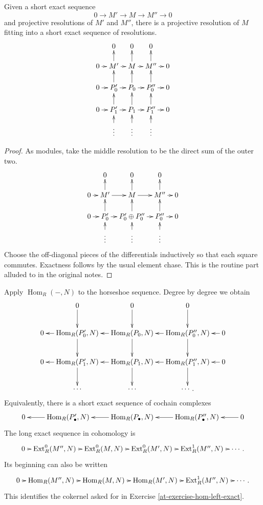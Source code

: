 \begin{lemma}
\label{at-lemma-horseshoe}
Given a short exact sequence
$$
0\longrightarrow M'
\longrightarrow M
\longrightarrow M''
\longrightarrow0
$$
and projective resolutions of $M'$ and
$M''$, there is a projective resolution of
$M$ fitting into a short exact sequence of
resolutions.
$$
\xymatrix@C=.7em@R=1.5em{
  & 0
    & 0
    & 0 \\
0 \ar[r]
  & M' \ar[r] \ar[u]
  & M \ar[r] \ar[u]
  & M'' \ar[r] \ar[u]
  & 0 \\
0 \ar[r]
  & P'_0 \ar[r] \ar[u]
  & P_0 \ar[r] \ar[u]
  & P''_0 \ar[r] \ar[u]
  & 0 \\
0 \ar[r]
  & P'_1 \ar[r] \ar[u]
  & P_1 \ar[r] \ar[u]
  & P''_1 \ar[r] \ar[u]
  & 0 \\
  & \vdots \ar[u]
  & \vdots \ar[u]
  & \vdots \ar[u]
}
$$
\end{lemma}

\begin{proof}
As modules, take the middle resolution to
be the direct sum of the outer two.
$$
\xymatrix@C=.7em@R=1.5em{
  & 0
    & 0
    & 0 \\
0 \ar[r]
  & M' \ar[r] \ar[u]
  & M \ar[r] \ar[u]
  & M'' \ar[r] \ar[u]
  & 0 \\
0 \ar[r]
  & P'_0 \ar[r] \ar[u]
  & P'_0\oplus P''_0 \ar[r] \ar[u]
  & P''_0 \ar[r] \ar[u]
  & 0 \\
  & \vdots \ar[u]
  & \vdots \ar[u]
  & \vdots \ar[u].
}
$$
Choose the off-diagonal pieces of the
differentials inductively so that each
square commutes.  Exactness follows by the
usual element chase.  This is the routine
part alluded to in the original notes.
\end{proof}

\noindent
Apply $\operatorname{Hom}_R(-,N)$ to the
horseshoe sequence.  Degree by degree we
obtain
$$
\xymatrix@C=1.1em{
  & 0 \ar[d]
    & 0 \ar[d]
    & 0 \ar[d] \\
0
  & \operatorname{Hom}_R(P'_0,N)
    \ar[l] \ar[d]
  & \operatorname{Hom}_R(P_0,N)
    \ar[l] \ar[d]
  & \operatorname{Hom}_R(P''_0,N)
    \ar[l] \ar[d]
  & 0 \ar[l] \\
0
  & \operatorname{Hom}_R(P'_1,N)
    \ar[l] \ar[d]
  & \operatorname{Hom}_R(P_1,N)
    \ar[l] \ar[d]
  & \operatorname{Hom}_R(P''_1,N)
    \ar[l] \ar[d]
  & 0 \ar[l] \\
  & \cdots & \cdots & \cdots.
}
$$
Equivalently, there is a short exact
sequence of cochain complexes
$$
\xymatrix{
0
  & \operatorname{Hom}_R(P'_\bullet,N)
    \ar[l]
  & \operatorname{Hom}_R(P_\bullet,N)
    \ar[l]
  & \operatorname{Hom}_R(P''_\bullet,N)
    \ar[l]
  & 0 \ar[l].
}
$$
The long exact sequence in cohomology is
$$
\xymatrix@C=.55em{
0 \ar[r]
  & \operatorname{Ext}^0_R(M'',N)
    \ar[r]
  & \operatorname{Ext}^0_R(M,N)
    \ar[r]
  & \operatorname{Ext}^0_R(M',N)
    \ar[r]
  & \operatorname{Ext}^1_R(M'',N)
    \ar[r]
  & \cdots.
}
$$
Its beginning can also be written
$$
\xymatrix@C=.55em{
0 \ar[r]
  & \operatorname{Hom}_R(M'',N)
    \ar[r]
  & \operatorname{Hom}_R(M,N)
    \ar[r]
  & \operatorname{Hom}_R(M',N)
    \ar[r]
  & \operatorname{Ext}^1_R(M'',N)
    \ar[r]
  & \cdots.
}
$$
This identifies the cokernel asked for in
Exercise
\ref{at-exercise-hom-left-exact}.

